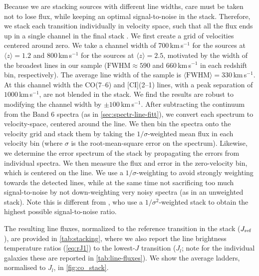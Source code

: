\documentclass[twocolumn]{aastex62}
\newcommand{\avg}[1]{\ensuremath{\langle #1 \rangle}}
\begin{document}
Because we are stacking sources with different line widths, care must be taken
not to lose flux, while keeping an optimal signal-to-noise in the stack.
Therefore, we stack each transition individually in velocity space, such that
all the flux ends up in a single channel in the final stack
\citep[cf.][]{Spilker2014}.  We first create a grid of velocities centered
around zero.  We take a channel width of 700\,km\,s$^{-1}$ for the sources at
$\avg{z}=1.2$ and 800\,km\,s$^{-1}$ for the sources at $\avg{z}=2.5$, motivated
by the width of the broadest lines in our sample ($\mathrm{FWHM}\approx 590$
and 660\,km\,s$^{-1}$ in each redshift bin, respectively).  The average line
width of the sample is $\avg{\mathrm{FWHM}} = 330$\,km\,s$^{-1}$.  At this
channel width the CO(7--6) and [CI](2--1) lines, with a peak separation of
$1000$\,km\,s$^{-1}$, are not blended in the stack.  We find the results are
robust to modifying the channel width by $\pm 100$\,km\,s$^{-1}$.  After
subtracting the continuum from the Band 6 spectra (as in
\autoref{sec:spectr-line-fitt}), we convert each spectrum to velocity-space,
centered around the line.  We then bin the spectra onto the velocity grid and
stack them by taking the $1/\sigma$-weighted mean flux in each velocity bin
(where $\sigma$ is the root-mean-square error on the spectrum).  Likewise, we
determine the error spectrum of the stack by propagating the errors from
individual spectra.  We then measure the flux and error in the zero-velocity
bin, which is centered on the line.  We use a $1/\sigma$-weighting to avoid
strongly weighting towards the detected lines, while at the same time not
sacrificing too much signal-to-noise by not down-weighting very noisy spectra
(as in an unweighted stack).  Note this is different from \cite{Spilker2014},
who use a $1/\sigma^{2}$-weighted stack to obtain the highest possible
signal-to-noise ratio.

The resulting line fluxes, normalized to the reference transition in the stack
($J_{\rm ref}$), are provided in \autoref{tab:stacking}, where we also report
the line brightness temperature ratios (\autoref{eq:rJ1}) to the lowest-$J$
transition ($J_{l}$; note for the individual galaxies these are reported in
\autoref{tab:line-fluxes}).  We show the average ladders, normalised to
$J_{l}$, in \autoref{fig:co_stack}.
\end{document}
